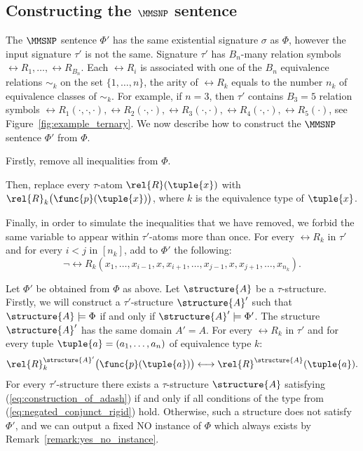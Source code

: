 \documentclass{lmcs}
\begin{document}
\subsection*{Constructing the $\MMSNP$ sentence} 
The $\MMSNP$ sentence $\Phi'$ has the same existential signature $\sigma$ as $\Phi$, however the input signature $\tau'$ is not the same.
Signature $\tau'$ has $B_n$-many relation symbols $\rel{R}_1,\ldots,\rel{R}_{B_n}$.
Each $\rel{R}_i$ is associated with one of the $B_n$ equivalence relations $\sim_k$ on the set $\{1,\ldots,n\}$, the arity of $\rel{R}_k$ equals to the number $n_k$ of equivalence classes of $\sim_k$. For example, if $n=3$, then $\tau'$ contains $B_3=5$ relation symbols $\rel{R}_1(\cdot,\cdot,\cdot), \rel{R}_2(\cdot,\cdot), \rel{R}_3(\cdot,\cdot), \rel{R}_4(\cdot,\cdot), \rel{R}_5(\cdot)$, see Figure~\ref{fig:example_ternary}.
We now describe how to construct the $\MMSNP$ sentence $\Phi'$ from $\Phi$.
\begin{compactitem} 
\item Firstly, remove all inequalities from $\Phi$. 
\item Then, replace every $\tau$-atom $\rel{R}(\tuple{x})$ with $\rel{R}_k\bigl(\func{p}(\tuple{x})\bigr)$, where $k$ is the equivalence type of $\tuple{x}$.
\item Finally, in order to simulate the inequalities that we have removed, we forbid the same variable to appear within $\tau'$-atoms more than once. For every $\rel{R}_k$ in $\tau'$ and for every $i<j$ in $[n_k]$, add to $\Phi'$ the following: 
\begin{equation}\label{eq:negated_conjunct_rigid} 
\neg\rel{R}_k(x_1,\ldots,x_{i-1},x,x_{i+1},\ldots,x_{j-1},x,x_{j+1},\ldots,x_{n_k}). 
\end{equation}
\end{compactitem}
Let $\Phi'$ be obtained from $\Phi$ as above.
Let $\structure{A}$ be a $\tau$-structure.
Firstly, we will construct a $\tau'$-structure $\structure{A}'$ such that $\structure{A}\models\Phi$ if and only if $\structure{A}'\models\Phi'$.
The structure $\structure{A}'$ has the same domain $A'=A$.
For every $\rel{R}_k$ in $\tau'$ and for every tuple $\tuple{a} = (a_1,\ldots,a_n)$ of equivalence type $k$:
\begin{equation}\label{eq:construction_of_adash}
\rel{R}_k^{\structure{A}'}\bigl(\func{p}(\tuple{a})\bigr) \longleftrightarrow \rel{R}^\structure{A}(\tuple{a}).
\end{equation}
For every $\tau'$-structure there exists a $\tau$-structure $\structure{A}$ satisfying (\ref{eq:construction_of_adash}) if and only if all conditions of the type from (\ref{eq:negated_conjunct_rigid}) hold.
Otherwise, such a structure does not satisfy $\Phi'$, and we can output a fixed NO instance of $\Phi$ which always exists by Remark~\ref{remark:yes_no_instance}.
\end{document}
